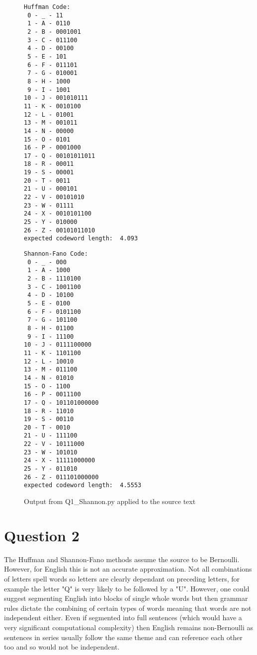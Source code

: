 \documentclass[a4paper]{article}
\begin{document}
\begin{figure}[H]
    \centering
    \begin{minipage}{0.48\textwidth}
        \centering
        \begin{verbatim}
Huffman Code:
 0 - _ - 11
 1 - A - 0110
 2 - B - 0001001
 3 - C - 011100
 4 - D - 00100
 5 - E - 101
 6 - F - 011101
 7 - G - 010001
 8 - H - 1000
 9 - I - 1001
10 - J - 001010111
11 - K - 0010100
12 - L - 01001
13 - M - 001011
14 - N - 00000
15 - O - 0101
16 - P - 0001000
17 - Q - 00101011011
18 - R - 00011
19 - S - 00001
20 - T - 0011
21 - U - 000101
22 - V - 00101010
23 - W - 01111
24 - X - 0010101100
25 - Y - 010000
26 - Z - 00101011010
expected codeword length:  4.093
        \end{verbatim}
        \caption{Output from Q1\_Huffman.py applied to the source text}
        \label{fig:Q1huff}
    \end{minipage}\hfill
    \begin{minipage}{0.48\textwidth}
        \centering
        \begin{verbatim}
Shannon-Fano Code:
 0 - _ - 000
 1 - A - 1000
 2 - B - 1110100
 3 - C - 1001100
 4 - D - 10100
 5 - E - 0100
 6 - F - 0101100
 7 - G - 101100
 8 - H - 01100
 9 - I - 11100
10 - J - 0111100000
11 - K - 1101100
12 - L - 10010
13 - M - 011100
14 - N - 01010
15 - O - 1100
16 - P - 0011100
17 - Q - 101101000000
18 - R - 11010
19 - S - 00110
20 - T - 0010
21 - U - 111100
22 - V - 10111000
23 - W - 101010
24 - X - 11111000000
25 - Y - 011010
26 - Z - 011101000000
expected codeword length:  4.5553
        \end{verbatim}
        \caption{Output from Q1\_Shannon.py applied to the source text}
        \label{fig:Q1shan}
    \end{minipage}
\end{figure}

\section*{Question 2}

The Huffman and Shannon-Fano methods assume the source to be Bernoulli. However, for English this is not an accurate approximation. Not all combinations of letters spell words so letters are clearly dependant on preceding letters, for example the letter "Q" is very likely to be followed by a "U". However, one could suggest segmenting English into blocks of single whole words but then grammar rules dictate the combining of certain types of words meaning that words are not independent either. Even if segmented into full sentences (which would have a very significant computational complexity) then English remains non-Bernoulli as sentences in series usually follow the same theme and can reference each other too and so would not be independent.
\end{document}
